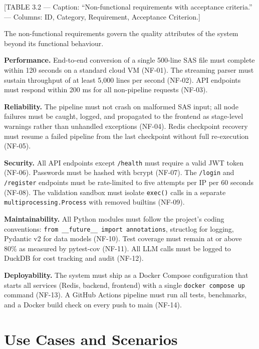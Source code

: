 [TABLE 3.2 --- Caption: ``Non-functional requirements with acceptance criteria.''
--- Columns: ID, Category, Requirement, Acceptance Criterion.]

The non-functional requirements govern the quality attributes of the system
beyond its functional behaviour.

\textbf{Performance.} End-to-end conversion of a single 500-line SAS file must
complete within 120 seconds on a standard cloud VM (NF-01). The streaming parser
must sustain throughput of at least 5,000 lines per second (NF-02). API
endpoints must respond within 200 ms for all non-pipeline requests (NF-03).

\textbf{Reliability.} The pipeline must not crash on malformed SAS input;
all node failures must be caught, logged, and propagated to the frontend as
stage-level warnings rather than unhandled exceptions (NF-04). Redis checkpoint
recovery must resume a failed pipeline from the last checkpoint without full
re-execution (NF-05).

\textbf{Security.} All API endpoints except \texttt{/health} must require a
valid JWT token (NF-06). Passwords must be hashed with bcrypt (NF-07). The
\texttt{/login} and \texttt{/register} endpoints must be rate-limited to five
attempts per IP per 60 seconds (NF-08). The validation sandbox must isolate
\texttt{exec()} calls in a separate \texttt{multiprocessing.Process} with
removed builtins (NF-09).

\textbf{Maintainability.} All Python modules must follow the project's coding
conventions: \texttt{from \_\_future\_\_ import annotations}, structlog for
logging, Pydantic v2 for data models (NF-10). Test coverage must remain at or
above 80\% as measured by pytest-cov (NF-11). All LLM calls must be logged to
DuckDB for cost tracking and audit (NF-12).

\textbf{Deployability.} The system must ship as a Docker Compose configuration
that starts all services (Redis, backend, frontend) with a single
\texttt{docker compose up} command (NF-13). A GitHub Actions pipeline must run
all tests, benchmarks, and a Docker build check on every push to main (NF-14).

\section{Use Cases and Scenarios}
\label{sec:use-cases}

